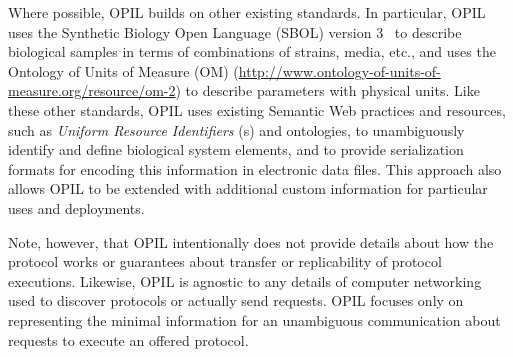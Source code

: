 Where possible, OPIL builds on other existing standards.
In particular, OPIL uses the Synthetic Biology Open Language (SBOL) version 3~\cite{SBOL3} to describe biological samples in terms of combinations of strains, media, etc., and uses the Ontology of Units of Measure (OM) (\url{http://www.ontology-of-units-of-measure.org/resource/om-2}) to describe parameters with physical units.
Like these other standards, OPIL uses existing Semantic Web practices and resources, such as \emph{Uniform Resource Identifiers} (s) and ontologies, to unambiguously identify and define biological system elements,
and to provide serialization formats for encoding this information in electronic data files.
This approach also allows OPIL to be extended with additional custom information for particular uses and deployments.

Note, however, that OPIL intentionally does not provide details about how the protocol works or guarantees about transfer or replicability of protocol executions. 
Likewise, OPIL is agnostic to any details of computer networking used to discover protocols or actually send requests.
OPIL focuses only on representing the minimal information for an unambiguous communication about requests to execute an offered protocol.

